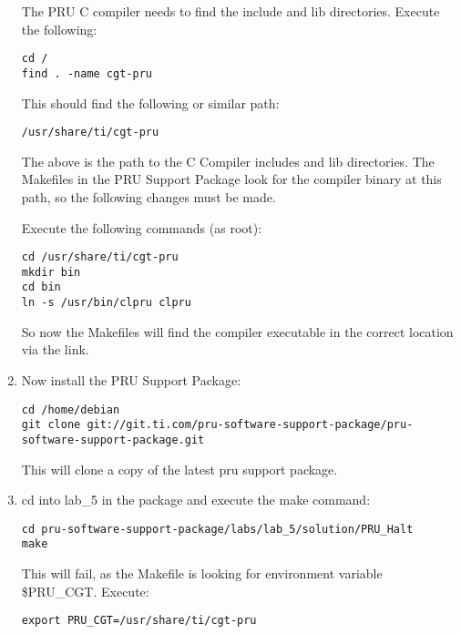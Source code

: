 \begin{enumerate}
The PRU C compiler needs to find the include and lib directories.  Execute the following:

\begin{verbatim}
cd /
find . -name cgt-pru
\end{verbatim}

This should find the following or similar path:

\begin{verbatim}
/usr/share/ti/cgt-pru
\end{verbatim}

The above is the path to the C Compiler includes and lib directories.  The Makefiles in the PRU Support Package look for the compiler binary at this path, so the following changes must be made.

Execute the following commands (as root):
\begin{verbatim}
cd /usr/share/ti/cgt-pru
mkdir bin
cd bin
ln -s /usr/bin/clpru clpru
\end{verbatim}
So now the Makefiles will find the compiler executable in the correct location via the link.
\item  Now install the PRU Support Package:

\begin{verbatim}
cd /home/debian
git clone git://git.ti.com/pru-software-support-package/pru-software-support-package.git
\end{verbatim}

This will clone a copy of the latest pru support package.
\item  cd into lab\_5 in the package and execute the make command:
\begin{verbatim}
cd pru-software-support-package/labs/lab_5/solution/PRU_Halt
make
\end{verbatim}
This will fail, as the Makefile is looking for environment variable \$PRU\_CGT.  Execute:

\begin{verbatim}
export PRU_CGT=/usr/share/ti/cgt-pru
\end{verbatim}


\end{enumerate}
